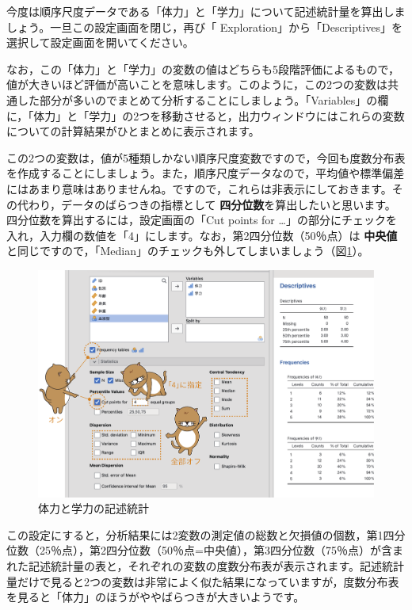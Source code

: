 \documentclass[
  12pt,
  a5jpaper,
  lualatex, ja=standard]{bxjsbook}
\renewcommand{\emph}[1]{\textbf{\color{emph} #1}}
\newcommand{\infig}[1]{\raisebox{-.2\zh}{\texttt{[image: images/assets/\#1]}}}
\begin{document}
今度は順序尺度データである「体力」と「学力」について記述統計量を算出しましょう。一旦この設定画面を閉じ，再び「\infig{analysis-descriptives.pdf} Exploration」から「Descriptives」を選択して設定画面を開いてください。

なお，この「体力」と「学力」の変数の値はどちらも5段階評価によるもので，値が大きいほど評価が高いことを意味します。このように，この2つの変数は共通した部分が多いのでまとめて分析することにしましょう。「Variables」の欄に，「体力」と「学力」の2つを移動させると，出力ウィンドウにはこれらの変数についての計算結果がひとまとめに表示されます。

この2つの変数は，値が5種類しかない順序尺度変数ですので，今回も度数分布表を作成することにしましょう。また，順序尺度データなので，平均値や標準偏差にはあまり意味はありませんね。ですので，これらは非表示にしておきます。その代わり，データのばらつきの指標として\emph{四分位数}を算出したいと思います。四分位数を算出するには，設定画面の「Cut points for \ldots」の部分にチェックを入れ，入力欄の数値を「4」にします。なお，第2四分位数（50％点）は\emph{中央値}と同じですので，「Median」のチェックも外してしまいましょう（図\ref{fig:Exploration-descriptives-tairyoku}）。

\begin{figure}[!ht]

{\centering \includegraphics[width=1\linewidth]{images/exploration/Exploration-descriptives-tairyoku} 

}

\caption{体力と学力の記述統計}\label{fig:Exploration-descriptives-tairyoku}
\end{figure}

この設定にすると，分析結果には2変数の測定値の総数と欠損値の個数，第1四分位数（25％点），第2四分位数（50％点=中央値），第3四分位数（75％点）が含まれた記述統計量の表と，それぞれの変数の度数分布表が表示されます。記述統計量だけで見ると2つの変数は非常によく似た結果になっていますが，度数分布表を見ると「体力」のほうがややばらつきが大きいようです。
\end{document}
